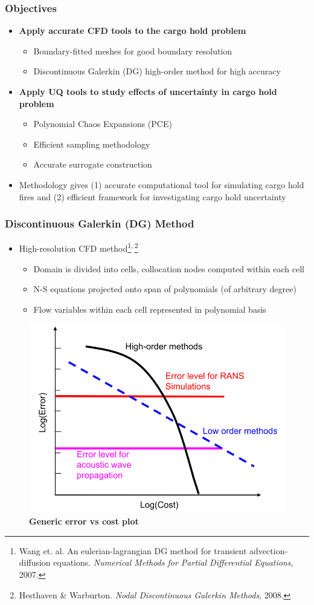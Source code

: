\documentclass[9pt]{beamer}
\begin{document}
\begin{frame}
\frametitle{Objectives}
\label{sec-4-7}

\begin{itemize}
\item \textbf{Apply accurate CFD tools to the cargo hold problem}
\begin{itemize}
\item Boundary-fitted meshes for good boundary resolution
\item Discontinuous Galerkin (DG) high-order method for high accuracy
\end{itemize}
\item \textbf{Apply UQ tools to study effects of uncertainty in cargo hold problem}
\begin{itemize}
\item Polynomial Chaos Expansions (PCE)
\item Efficient sampling methodology
\item Accurate surrogate construction
\end{itemize}
\item Methodology gives (1) accurate computational tool for simulating
  cargo hold fires and (2) efficient framework for investigating cargo
  hold uncertainty
\end{itemize}
\end{frame}
\begin{frame}
\frametitle{Discontinuous Galerkin (DG) Method}
\label{sec-4-8}

\begin{itemize}
\item High-resolution CFD method\footnote{Wang et. al. An eulerian-lagrangian DG method for transient advection-diffusion equations. \emph{Numerical Methods for Partial Differential Equations}, 2007.
 }\textsuperscript{,}\,\footnote{Hesthaven \& Warburton. \emph{Nodal Discontinuous Galerkin Methods}, 2008.
 }
\begin{itemize}
\item Domain is divided into cells, collocation nodes computed within each cell
\item N-S equations projected onto span of polynomials (of arbitrary degree)
\item Flow variables within each cell represented in polynomial basis
\end{itemize}
\end{itemize}
\begin{figure}
\includegraphics[width=0.5\linewidth]{errorvscostzj.png} \\
\textbf{Generic error vs cost plot}
\end{figure}
\end{frame}
\end{document}
